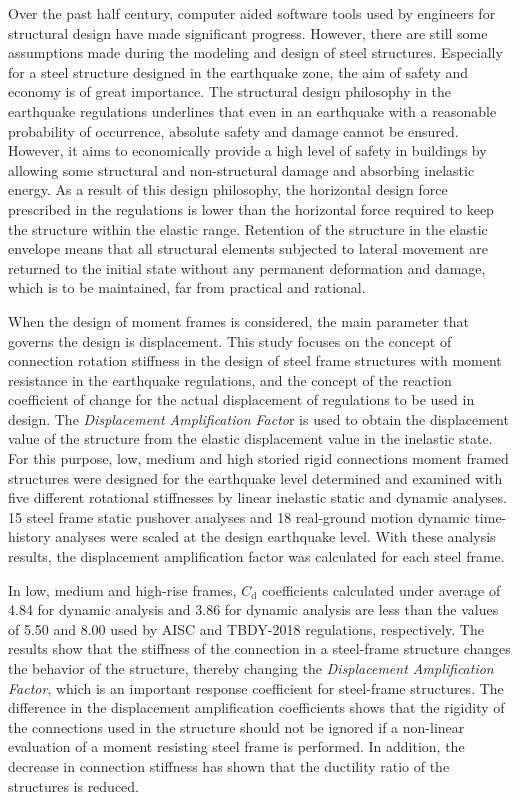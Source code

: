 Over the past half century, computer aided software tools used by
engineers for structural design have made significant progress. However,
there are still some assumptions made during the modeling and design
of steel structures. Especially for a steel structure designed in
the earthquake zone, the aim of safety and economy is of great importance.
The structural design philosophy in the earthquake regulations underlines
that even in an earthquake with a reasonable probability of occurrence,
absolute safety and damage cannot be ensured. However, it aims to
economically provide a high level of safety in buildings by allowing
some structural and non-structural damage and absorbing inelastic
energy. As a result of this design philosophy, the horizontal design
force prescribed in the regulations is lower than the horizontal force
required to keep the structure within the elastic range. Retention
of the structure in the elastic envelope means that all structural
elements subjected to lateral movement are returned to the initial
state without any permanent deformation and damage, which is to be
maintained, far from practical and rational. 

When the design of moment frames is considered, the main parameter
that governs the design is displacement. This study focuses on the
concept of connection rotation stiffness in the design of steel frame
structures with moment resistance in the earthquake regulations, and
the concept of the reaction coefficient of change for the actual displacement
of regulations to be used in design. The \emph{Displacement Amplification
Facto}r is used to obtain the displacement value of the structure
from the elastic displacement value in the inelastic state. For this
purpose, low, medium and high storied rigid connections moment framed
structures were designed for the earthquake level determined and examined
with five different rotational stiffnesses by linear inelastic static
and dynamic analyses. 15 steel frame static pushover analyses and
18 real-ground motion dynamic time-history analyses were scaled at
the design earthquake level. With these analysis results, the displacement
amplification factor was calculated for each steel frame.

In low, medium and high-rise frames, $C_{\mathrm{d}}$ coefficients
calculated under average of 4.84 for dynamic analysis and 3.86 for
dynamic analysis are less than the values of 5.50 and 8.00 used by
AISC and TBDY-2018 regulations, respectively. The results show that
the stiffness of the connection in a steel-frame structure changes
the behavior of the structure, thereby changing the \emph{Displacement
Amplification Factor}, which is an important response coefficient
for steel-frame structures. The difference in the displacement amplification
coefficients shows that the rigidity of the connections used in the
structure should not be ignored if a non-linear evaluation of a moment
resisting steel frame is performed. In addition, the decrease in connection
stiffness has shown that the ductility ratio of the structures is
reduced.
